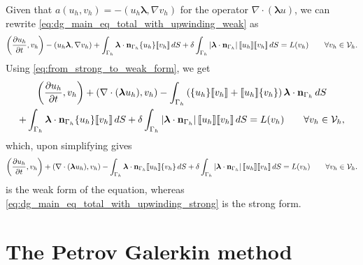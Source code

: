 \documentclass[oneside,a4paper,11pt]{report}
\begin{document}
Given that $a(u_h, v_h) = -(u_h \boldsymbol{\lambda}, \nabla v_h)$ for the operator $\nabla \cdot (\boldsymbol{\lambda} u)$, we can rewrite \cref{eq:dg_main_eq_total_with_upwinding_weak} as
\begin{equation}
    \left ( \frac{\partial u_h}{\partial t} , v_h \right ) - (u_h \boldsymbol{\lambda}, \nabla v_h) + \int_{\Gamma_h} \boldsymbol\lambda \cdot \mathbf{n}_{\Gamma_h} \{ u_h \} \llbracket v_h \rrbracket \, dS + \delta \int_{\Gamma_h} \left | \boldsymbol{\lambda} \cdot \mathbf{n}_{\Gamma_h} \right | \llbracket u_h \rrbracket \llbracket v_h \rrbracket \, dS = L(v_h) \qquad \forall v_h \in \mathcal{V}_h.
\end{equation}
Using \cref{eq:from_strong_to_weak_form}, we get
\begin{multline}
    \left ( \frac{\partial u_h}{\partial t} , v_h \right ) + (\nabla \cdot ( \boldsymbol{\lambda} u_h ), v_h ) -\int_{\Gamma_h} \left ( \{ u_h \} \llbracket v_h \rrbracket + \llbracket u_h \rrbracket \{ v_h \} \right ) \boldsymbol{\lambda} \cdot \mathbf{n}_{\Gamma_h} \, dS\\
    + \int_{\Gamma_h} \boldsymbol\lambda \cdot \mathbf{n}_{\Gamma_h} \{ u_h \} \llbracket v_h \rrbracket \, dS + \delta \int_{\Gamma_h} \left | \boldsymbol{\lambda} \cdot \mathbf{n}_{\Gamma_h} \right | \llbracket u_h \rrbracket \llbracket v_h \rrbracket \, dS = L(v_h) \qquad \forall v_h \in \mathcal{V}_h,
\end{multline}
which, upon simplifying gives
\begin{equation}
    \label{eq:dg_main_eq_total_with_upwinding_strong}
    \left ( \frac{\partial u_h}{\partial t} , v_h \right ) + (\nabla \cdot ( \boldsymbol{\lambda} u_h ), v_h ) -\int_{\Gamma_h} \boldsymbol{\lambda} \cdot \mathbf{n}_{\Gamma_h}\llbracket u_h \rrbracket \{ v_h \} \, dS + \delta \int_{\Gamma_h} \left | \boldsymbol{\lambda} \cdot \mathbf{n}_{\Gamma_h} \right | \llbracket u_h \rrbracket \llbracket v_h \rrbracket \, dS = L(v_h) \qquad \forall v_h \in \mathcal{V}_h.
\end{equation}
 is the weak form of the equation, whereas \cref{eq:dg_main_eq_total_with_upwinding_strong} is the strong form.

\section{The Petrov Galerkin method}
\end{document}
